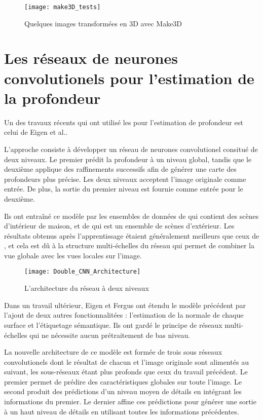 \begin{figure}[H]
\texttt{[image: make3D\_tests]}
\caption{Quelques images transformées en 3D avec Make3D}{}
\end{figure}

\section{Les réseaux de neurones convolutionels pour l'estimation de la profondeur}

Un des travaux récents qui ont utilisé les 
pour l'estimation de profondeur est celui de Eigen et al.\cite{eigen2014depth}.

L'approche consiste à développer un réseau de neurones convolutionel consitué de
deux niveaux. Le premier prédit la profondeur à un niveau global, tandis que le
deuxième applique des raffinements successifs afin de générer une carte des
profondeurs plus précise. Les deux niveaux acceptent l'image originale comme
entrée. De plus, la sortie du premier niveau est fournie comme entrée pour
le deuxième.

Ils ont entraîné ce modèle par les ensembles de données de  qui
contient des scènes d'intérieur de maison, et de  qui est un ensemble
de scènes d'extérieur. Les résultats obtenus après l'apprentissage étaient
généralement meilleurs que ceux de , et cela est dû à la
structure multi-échelles du réseau qui permet de combiner la vue globale avec les
vues locales sur l'image.

\begin{figure}[H]
\begin{center}
\texttt{[image: Double\_CNN\_Architecture]}
\caption{L'architecture du réseau à deux niveaux}{}
\end{center}
\end{figure}

\vspace{-1em}

Dans un travail ultérieur, Eigen et Fergus\cite{eigen2015predicting} ont étendu
le modèle précédent par l'ajout de deux autres fonctionnalitées : l'estimation
de la normale de chaque surface et l'étiquetage sémantique. Ils ont gardé le
principe de réseaux multi-échelles qui ne nécessite aucun prétraitement de bas
niveau.

La nouvelle architecture de ce modèle est formée de trois sous réseaux
convolutionels dont le résultat de chacun et l'image originale sont alimentés
au suivant, les sous-réseaux étant plus profonds que ceux du travail précédent.
Le premier permet de prédire des caractéristiques globales sur toute l'image.
Le second produit des prédictions d'un niveau moyen de détails en intégrant les
informations du premier. Le dernier affine ces prédictions pour générer une
sortie à un haut niveau de détails en utilisant toutes les informations précédentes.

